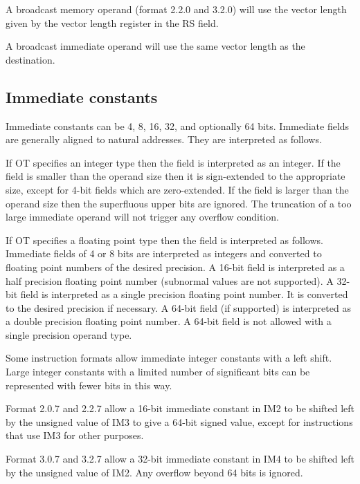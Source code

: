 \documentclass[forwardcom.tex]{subfiles}
\begin{document}
A broadcast memory operand (format 2.2.0 and 3.2.0) will use the vector length given by the vector length register in the RS field.
\vspace{2mm}

A broadcast immediate operand will use the same vector length as the destination.

\subsection{Immediate constants}
Immediate constants can be 4, 8, 16, 32, and optionally 64 bits. Immediate fields are generally aligned to natural addresses. They are interpreted as follows.
\vspace{2mm}

If OT specifies an integer type then the field is interpreted as an integer. If the field is smaller than the operand size then it is sign-extended to the appropriate size, except for 4-bit fields which are zero-extended. If the field is larger than the operand size then the superfluous upper bits are ignored. The truncation of a too large immediate operand will not trigger any overflow condition.
\vspace{2mm}

If OT specifies a floating point type then the field is interpreted as follows. Immediate fields of 4 or 8 bits are interpreted as integers and converted to floating point numbers of the desired precision. A 16-bit field is interpreted as a half precision floating point number (subnormal values are not supported). A 32-bit field is interpreted as a single precision floating point number. It is converted to the desired precision if necessary. A 64-bit field (if supported) is interpreted as a double precision floating point number. A 64-bit field is not allowed with a single precision operand type.
\vspace{2mm}

Some instruction formats allow immediate integer constants with a left shift. Large integer constants with a limited number of significant bits can be represented with fewer bits in this way.

Format 2.0.7 and 2.2.7 allow a 16-bit immediate constant in IM2 to be shifted left by the unsigned value of IM3 to give a 64-bit signed value, except for instructions that use IM3 for other purposes.

Format 3.0.7 and 3.2.7 allow a 32-bit immediate constant in IM4 to be shifted left by the unsigned value of IM2.
Any overflow beyond 64 bits is ignored.
\end{document}
